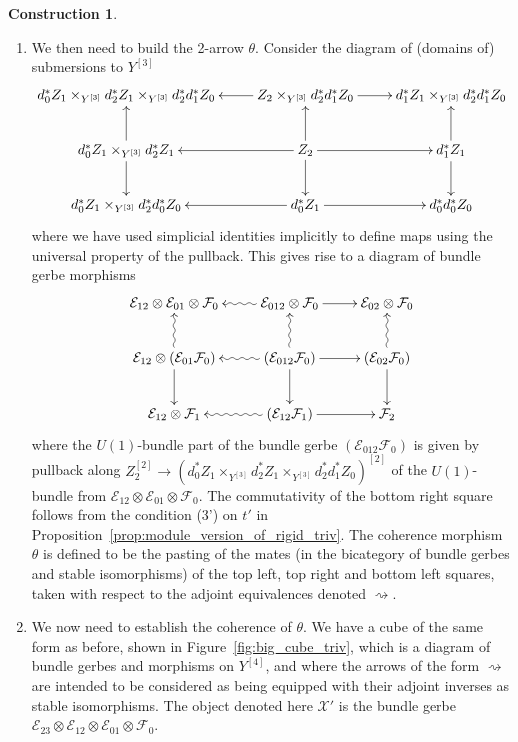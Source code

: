 \documentclass[12pt]{amsart}
\theoremstyle{plain}
\theoremstyle{definition}
\newtheorem{construction}[theorem]{Construction}
\theoremstyle{remark}
\numberwithin{equation}{section}
\newcommand{\cE}{{\mathcal E}}
\newcommand{\cF}{{\mathcal F}}
\newcommand{\<}{\langle}
\renewcommand{\>}{\rangle}
\begin{document}
\begin{construction}
\begin{enumerate}
\item We then need to build the 2-arrow $\theta$. Consider the diagram of (domains of) submersions to $Y^{[3]}$
\[
	\xymatrix{
		 d_0^*Z_1\times_{Y^{[3]}} d_2^* Z_1 \times_{Y^{[3]}} d_2^*d_1^* Z_0 
		 & 
		\ar[l] Z_2 \times_{Y^{[3]}} d_2^*d_1^* Z_0 \ar[r] 
		 & 
		 d_1^*Z_1 \times_{Y^{[3]}} d_2^*d_1^*Z_0
		 \\
		 \ar[u] d_0^* Z_1 \times_{Y^{[3]}} d_2^* Z_1 \ar[d] 
		& 
		\ar[l] \ar[u] Z_2 \ar[r] \ar[d] 
		&
		 \ar[u] d_1^*Z_1  \ar[d]
		\\
		d_0^* Z_1 \times_{Y^{[3]}}  d_2^* d_0^*Z_0 
		&
		\ar[l]d_0^* Z_1 \ar[r] 
		& 
		d_0^*d_0^*Z_0
	}	
\]
where we have used simplicial identities implicitly to define maps using the universal property of the pullback. This gives rise to a diagram of bundle gerbe morphisms
\begin{equation}\label{eq:pre-actionator}
	\xymatrix{
		\cE_{12}\otimes \cE_{01}\otimes \cF_0 
		& 
		\ar@{~>}[l]\cE_{012}\otimes \cF_0 \ar[r]
		&  
		\cE_{02} \otimes \cF_0 
		\\
		\ar@{~>}[u] \cE_{12} \otimes (\cE_{01}\cF_0) \ar[d] 
		& 
		\ar@{~>}[l] \ar@{~>}[u] (\cE_{012}\cF_0) \ar[r] \ar[d] 
		& 
		\ar@{~>}[u] (\cE_{02}\cF_0) \ar[d]
		\\
		\cE_{12}\otimes \cF_1 
		& 
		\ar@{~>}[l](\cE_{12}\cF_1)  \ar[r] 
		& 
		\cF_2
	}
\end{equation}
where the $U(1)$-bundle part of the bundle gerbe $(\cE_{012}\cF_0)$ is given by pullback along $Z_2^{[2]}\to (d_0^*Z_1\times_{Y^{[3]}} d_2^* Z_1 \times_{Y^{[3]}} d_2^*d_1^* Z_0)^{[2]}$ of the $U(1)$-bundle from $\cE_{12}\otimes \cE_{01}\otimes \cF_0$.
The commutativity of the bottom right square follows from the condition (3') on $t'$ in Proposition~\ref{prop:module_version_of_rigid_triv}.
The coherence morphism $\theta$ is defined to be the pasting of the mates (in the bicategory of bundle gerbes and stable isomorphisms) of the top left, top right and bottom left squares, taken with respect to the adjoint equivalences denoted $\rightsquigarrow$.

\item We now need to establish the coherence of $\theta$. We have a cube of the same form as before, shown in Figure~\ref{fig:big_cube_triv}, which is a diagram of bundle gerbes and morphisms on $Y^{[4]}$, and where the arrows of the form $\rightsquigarrow$  are intended to be considered as being equipped with their adjoint inverses as stable isomorphisms.
The object denoted here $\mathcal{X}'$ is the bundle gerbe $\cE_{23}\otimes\cE_{12}\otimes \cE_{01}\otimes \cF_0$.


\end{enumerate}
\end{construction}
\end{document}
